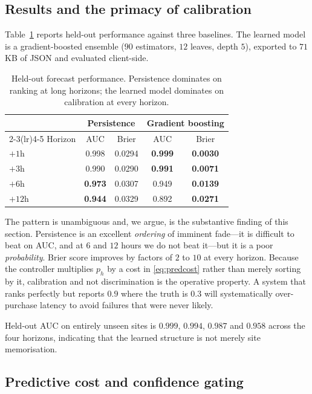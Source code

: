 \documentclass[10pt,twocolumn]{article}
\begin{document}
\subsection{Results and the primacy of calibration}

Table~\ref{tab:model} reports held-out performance against three baselines. The
learned model is a gradient-boosted ensemble ($90$ estimators, $12$ leaves,
depth $5$), exported to $71$ KB of JSON and evaluated client-side.

\begin{table}[t]
\centering
\caption{Held-out forecast performance. Persistence dominates on ranking at long
horizons; the learned model dominates on calibration at every horizon.}
\label{tab:model}
\small
\begin{tabular}{@{}lcccc@{}}
\toprule
& \multicolumn{2}{c}{Persistence} & \multicolumn{2}{c}{Gradient boosting} \\
\cmidrule(lr){2-3}\cmidrule(lr){4-5}
Horizon & AUC & Brier & AUC & Brier \\
\midrule
$+1$h  & 0.998 & 0.0294 & \textbf{0.999} & \textbf{0.0030} \\
$+3$h  & 0.990 & 0.0290 & \textbf{0.991} & \textbf{0.0071} \\
$+6$h  & \textbf{0.973} & 0.0307 & 0.949 & \textbf{0.0139} \\
$+12$h & \textbf{0.944} & 0.0329 & 0.892 & \textbf{0.0271} \\
\bottomrule
\end{tabular}
\end{table}

The pattern is unambiguous and, we argue, is the substantive finding of this
section. Persistence is an excellent \emph{ordering} of imminent fade---it is
difficult to beat on AUC, and at $6$ and $12$ hours we do not beat it---but it is
a poor \emph{probability}. Brier score improves by factors of $2$ to $10$ at
every horizon. Because the controller multiplies $p_{h}$ by a cost in
\eqref{eq:predcost} rather than merely sorting by it, calibration and not
discrimination is the operative property. A system that ranks perfectly but
reports $0.9$ where the truth is $0.3$ will systematically over-purchase
latency to avoid failures that were never likely.

Held-out AUC on entirely unseen sites is $0.999$, $0.994$, $0.987$ and $0.958$
across the four horizons, indicating that the learned structure is not merely
site memorisation.

\subsection{Predictive cost and confidence gating}
\end{document}
